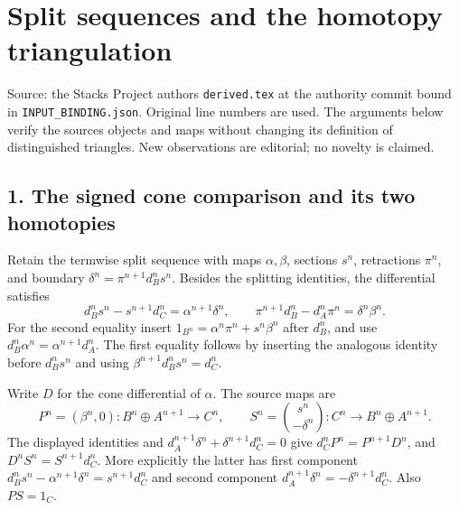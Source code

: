 \section{Split sequences and the homotopy triangulation}\label{proofs-2995-3485-split-sequences-and-the-homotopy-triangulation}

Source:\allowbreak{} the Stacks Project authors\textquotesingle{} \texttt{derived.\allowbreak{}tex} at the authority commit bound in \texttt{INPUT\_\allowbreak{}BINDING.\allowbreak{}json}. Original line numbers are used. The arguments below verify the source\textquotesingle s objects and maps without changing its definition of distinguished triangles. New observations are editorial; no novelty is claimed.

\subsection{1. The signed cone comparison and its two homotopies}\label{proofs-2995-3485-the-signed-cone-comparison-and-its-two-homotopies}

Retain the termwise split sequence with maps \(\alpha,\beta\),\allowbreak{} sections \(s^n\),\allowbreak{} retractions \(\pi^n\),\allowbreak{} and boundary \(\delta^n=\pi^{n+1}d_B^ns^n\). Besides the splitting identities,\allowbreak{} the differential satisfies \[
d_B^ns^n-s^{n+1}d_C^n=\alpha^{n+1}\delta^n,
\qquad
\pi^{n+1}d_B^n-d_A^n\pi^n=\delta^n\beta^n.
\] For the second equality insert \(1_{B^n}=\alpha^n\pi^n+s^n\beta^n\) after \(d_B^n\),\allowbreak{} and use \(d_B^n\alpha^n=\alpha^{n+1}d_A^n\). The first equality follows by inserting the analogous identity before \(d_B^ns^n\) and using \(\beta^{n+1}d_B^ns^n=d_C^n\).

Write \(D\) for the cone differential of \(\alpha\). The source maps are \[
P^n=(\beta^n,0):B^n\oplus A^{n+1}\to C^n,
\qquad S^n=\binom{s^n}{-\delta^n}:C^n\to B^n\oplus A^{n+1}.
\] The displayed identities and \(d_A^{n+1}\delta^n+\delta^{n+1}d_C^n=0\) give \(d_C^nP^n=P^{n+1}D^n\),\allowbreak{} and \(D^nS^n=S^{n+1}d_C^n\). More explicitly the latter has first component \(d_B^ns^n-\alpha^{n+1}\delta^n=s^{n+1}d_C^n\) and second component \(d_A^{n+1}\delta^n=-\delta^{n+1}d_C^n\). Also \(PS=1_C\).

